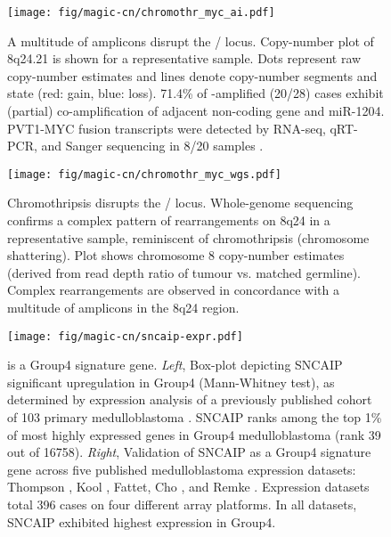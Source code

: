 \clearpage


\begin{figure}[t]
	\begin{center}
		\texttt{[image: fig/magic-cn/chromothr\_myc\_ai.pdf]}
	\end{center}
	\caption[A multitude of amplicons disrupt the / locus]
	{
	A multitude of amplicons disrupt the / locus.
	Copy-number plot of 8q24.21 is shown for a representative sample. Dots represent raw copy-number estimates and lines denote copy-number segments and state (red: gain, blue: loss). 71.4\% of -amplified (20/28) cases exhibit (partial) co-amplification of adjacent non-coding  gene and miR-1204. PVT1-MYC fusion transcripts were detected by RNA-seq, qRT-PCR, and Sanger sequencing in 8/20 samples .
	}
	\label{fig:chromothr_myc}
\end{figure}

\begin{figure}[b]
	\begin{center}
		\texttt{[image: fig/magic-cn/chromothr\_myc\_wgs.pdf]}
	\end{center}
	\caption[Chromothripsis disrupts the / locus.]
	{
	Chromothripsis disrupts the / locus.
	Whole-genome sequencing confirms a complex pattern of rearrangements on 8q24 in a representative sample, reminiscent of chromothripsis (chromosome shattering).
	Plot shows chromosome 8 copy-number estimates (derived from read depth ratio of tumour vs. matched germline).
	Complex rearrangements are observed in concordance with a multitude of amplicons in the 8q24 region.
	}
	\label{fig:chromothr_myc_wgs}
\end{figure}

\clearpage

\begin{figure}[t]
	\begin{center}
		\texttt{[image: fig/magic-cn/sncaip-expr.pdf]}
	\end{center}
	\caption[ is a Group4 signature gene]
	{
	 is a Group4 signature gene.
	\emph{Left}, Box-plot depicting SNCAIP significant upregulation in Group4 (Mann-Whitney test), as determined by expression analysis of a previously published cohort of 103 primary medulloblastoma . SNCAIP ranks among the top 1\% of most highly expressed genes in Group4 medulloblastoma (rank 39 out of 16758).
	\emph{Right}, Validation of SNCAIP as a Group4 signature gene across five published medulloblastoma expression datasets: Thompson , Kool , Fattet, Cho , and Remke . Expression datasets total 396 cases on four different array platforms. In all datasets, SNCAIP exhibited highest expression in Group4.
	}
	\label{fig:sncaip-expr}
\end{figure}

